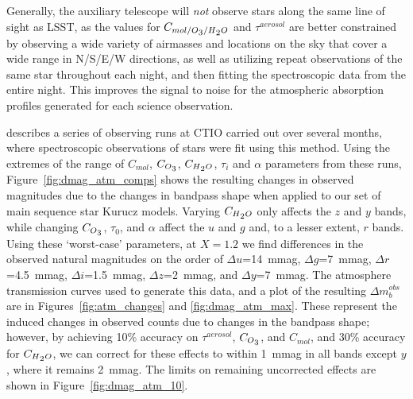 \documentclass[12pt,preprint]{aastex}
\newcommand{\water}   {H\textsubscript{2}O}
\newcommand{\ozone}    {O\textsubscript{3}}
\begin{document}
Generally, the auxiliary telescope will {\it not} observe stars along the
same line of sight as LSST, as the values for
$C_{mol/\ozone/\water}$ and $\tau^{aerosol}$ are better
constrained by observing a wide variety of airmasses and locations on
the sky that cover a wide range in N/S/E/W directions, as well as utilizing
repeat observations of the same star throughout each night, and then
fitting the spectroscopic data from the entire night. This improves the 
signal to noise for the atmospheric absorption profiles generated for each science observation.


\citet{Burke2010b} describes a series of observing runs at CTIO carried out over several
months, where spectroscopic observations of stars were fit using this method. Using the extremes of the range of $C_{mol}$,
$C_{\ozone}$, $C_{\water}$, $\tau_i$ and $\alpha$ parameters from these runs,
Figure~\ref{fig:dmag_atm_comps} shows the resulting changes in
observed magnitudes due to the changes in bandpass shape when applied
to our set of main sequence star Kurucz models. Varying
$C_{\water}$ only affects the $z$ and $y$ bands, while changing $C_{\ozone}$,
$\tau_0$, and $\alpha$ affect the $u$ and $g$ and, to a lesser extent, $r$
bands. Using these `worst-case' parameters, at $X=1.2$ we find
differences in the observed natural magnitudes on the order of $\Delta u$=14~mmag, $\Delta g$=7~mmag, $\Delta r$=4.5~mmag,
$\Delta i$=1.5~mmag, $\Delta z$=2~mmag, and $\Delta y$=7~mmag. The 
atmosphere transmission curves used to generate this data, and a plot
of the resulting $\Delta m_b^{obs}$ are in Figures~\ref{fig:atm_changes}
and \ref{fig:dmag_atm_max}.  These represent the induced changes in
observed counts due to changes in the bandpass shape; however, by
achieving 10\% accuracy on $\tau^{aerosol}$, $C_{\ozone}$, and
$C_{mol}$, and 30\% accuracy for $C_{\water}$, we can correct for
these effects to within 1~mmag in all bands except $y$, where it
remains 2~mmag. The limits on remaining uncorrected effects are shown in Figure~\ref{fig:dmag_atm_10}. 
\end{document}

